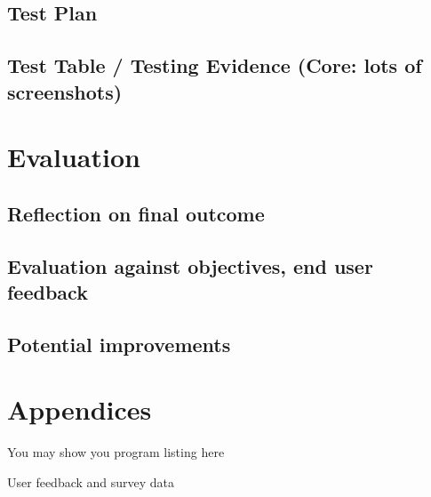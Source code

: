 \documentclass[titlepage]{article}
\begin{document}
\subsection{Test Plan}

\subsection{Test Table / Testing Evidence (Core: lots of screenshots)}

\section{Evaluation}

\subsection{Reflection on final outcome}

\subsection{Evaluation against objectives, end user feedback}

\subsection{Potential improvements}

\section{Appendices}

You may show you program listing here

User feedback and survey data
\end{document}
